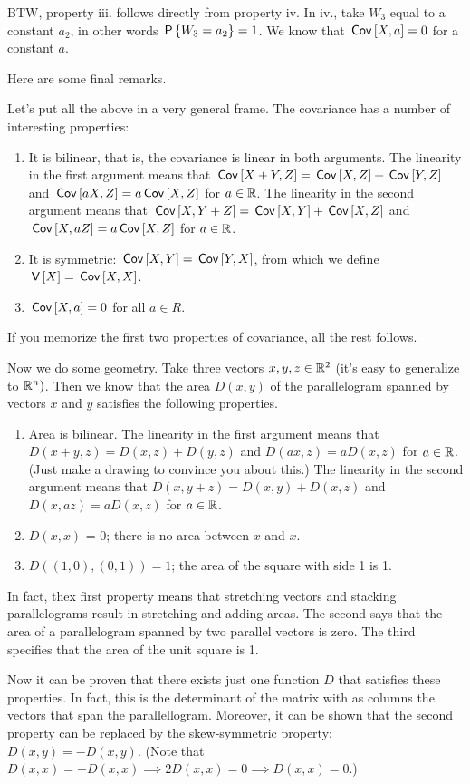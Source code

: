 \begin{exercise}
\begin{solution}
BTW, property iii. follows directly from property iv. In iv., take $W_3$ equal to a constant $a_2$, in other words $\P{W_3=a_2}=1$. We know that $\cov{X, a} = 0$ for a constant $a$.

Here are  some final remarks.

Let's put all the above in a very general frame.  The covariance has a number of interesting properties:
\begin{enumerate}
\item  It is bilinear, that is, the covariance is linear in both arguments. The linearity in the first argument means that $\cov{X+Y, Z}=\cov{X,Z}+\cov{Y,Z}$ and $\cov{a X, Z}=a\cov{X,Z}$ for $a\in \R$. The linearity in the second argument means that $\cov{X, Y+Z}=\cov{X,Y}+\cov{X,Z}$ and $\cov{X, a Z}=a\cov{X,Z}$ for $a\in \R$.
\item It is symmetric: $\cov{X, Y}=\cov{Y,X}$, from which we define $\V X = \cov{X,X}$.
\item  $\cov{X,a} = 0$ for all $a\in R$.
\end{enumerate}
If you memorize the first two properties of covariance, all the rest follows.

Now we do some geometry. Take three vectors $x,y, z\in \R^2$ (it's easy to generalize to $\R^n)$. Then we know that the area $D(x,y)$ of the parallelogram spanned by vectors $x$ and $y$  satisfies the following properties.
\begin{enumerate}
\item  Area is bilinear. The linearity in the first argument means that $D(x+y, z) = D(x, z) + D(y, z)$ and $D(ax, z)=a D(x, z)$ for $a\in \R$. (Just make a drawing to convince you about this.) The linearity in the second argument means that  $D(x, y+z) = D(x, y) + D(x, z)$  and $D(x, a z)=a D(x, z)$ for $a\in \R$.
\item  $D(x,x)$ = 0; there is no area between $x$ and $x$.
\item $D( (1,0), (0,1)) = 1$; the area of the square with side 1 is 1.
\end{enumerate}
In fact, thex first property means that stretching vectors and stacking parallelograms result in stretching and adding areas.
The second says that the area of a parallelogram spanned by two parallel vectors is zero. The third specifies that the area of the unit square is 1.

Now it can be proven that there exists just one function $D$ that satisfies these properties. In fact, this is the determinant of the matrix with as columns the vectors that span the parallellogram. Moreover, it can be shown that the second property can be replaced by the skew-symmetric property: $D(x,y) = - D(x,y)$.
(Note that $D(x,x) = -D(x,x) \implies 2 D(x,x) = 0 \implies D(x,x) = 0$.)


\end{solution}
\end{exercise}
